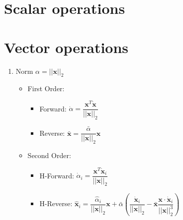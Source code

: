 \documentclass{article}
\newcommand{\vx}{\mathbf{x}}
\newcommand{\vxb}{\bar{\mathbf{x}}}
\newcommand{\vxpi}{\dot{\mathbf{x}}_{i}}
\newcommand{\vxhi}{\hat{\mathbf{x}}_{i}}
\newcommand{\ab}{\bar{\alpha}}
\newcommand{\api}{\dot{\alpha}_{i}}
\newcommand{\ahi}{\hat{\alpha}_{i}}
\begin{document}
    \section{Scalar operations} \label{sec:scalar-operations}


    \section{Vector operations} \label{sec:vector-operations}

    \begin{enumerate}
        \item Norm $\alpha = ||\mathbf{x}||_{2}$
        \begin{itemize}
            \item First Order:
            \begin{itemize}
                \item Forward: $\dot{\alpha} = \dfrac{ \mathbf{x}^{T} \dot{\mathbf{x}}}{||\mathbf{x}||_{2}}$
                \item Reverse: $\bar{\mathbf{x}} = \dfrac{\bar{\alpha}}{||\mathbf{x}||_{2}} \mathbf{x}$
            \end{itemize}
            \item Second Order:
            \begin{itemize}
                \item H-Forward: $\api = \dfrac{ \vx^{T} \vxpi}{|| \vx ||_{2}}$
                \item H-Reverse: $\vxhi = \dfrac{\ahi}{|| \vx ||_{2}} \vx + \ab \left( \dfrac{\vxpi}{|| \vx ||_{2}} - \vxb \dfrac{\vx \cdot \vxpi}{|| \vx ||_{2}^{3}} \right)$
            \end{itemize}
        \end{itemize}


\end{enumerate}
\end{document}
